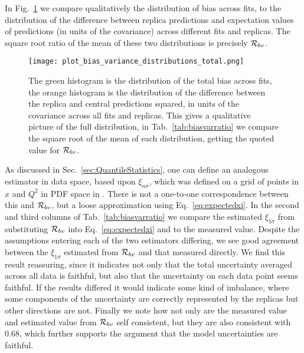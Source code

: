 In Fig.~\ref{eq:bias_varinace_distributions} we compare qualitatively the
distribution of bias across fits, to the distribution of the difference between
replica predictions and expectation values of predictions (in units of the
covariance) across different fits and replicas. The square root ratio of the
mean of these two distributions is precisely $\mathcal{R}_{bv}$.

\begin{figure}[h]
    \centering
    \texttt{[image: plot\_bias\_variance\_distributions\_total.png]}
    \caption{The green histogram is the distribution of the total bias across
    fits, the orange histogram is the distribution of the difference between the
    replica and central predictions squared, in units of the covariance across
    all fits and replicas. This gives a qualitative picture of the full
    distribution, in Tab.~\ref{tab:biasvarratio} we compare the square root of
    the mean of each distribution, getting the quoted value for
    $\mathcal{R}_{bv}$.}
    \label{eq:bias_varinace_distributions}
\end{figure}

As discussed in Sec.~\ref{sec:QuantileStatistics}, one can define an analogous
estimator in data space, based upon $\xi_{n\sigma}$, which was defined on a grid
of points in $x$ and $Q^2$ in PDF space in \cite{nnpdf30}. There is not a
one-to-one correspondence between this and $\mathcal{R}_{bv}$, but a loose
approximation using Eq.~\ref{eq:expectedxi}. In the second and third columns of
Tab.~\ref{tab:biasvarratio} we compare the estimated $\xi_{1\sigma}$ from
substituting $\mathcal{R}_{bv}$ into Eq.~\ref{eq:expectedxi} and to the measured
value. Despite the assumptions entering each of the two estimators differing, we
see good agreement between the $\xi_{1\sigma}$ estimated from $\mathcal{R}_{bv}$
and that measured directly. We find this result reassuring, since it indicates
not only that the total uncertainty averaged across all data is faithful, but
also that the uncertainty on each data point seems faithful. If the results
differed it would indicate some kind of imbalance, where some components of the
uncertainty are correctly represented by the replicas but other directions are
not. Finally we note how not only are the measured value and estimated value
from $\mathcal{R}_{bv}$ self consistent, but they are also consistent with $0.68$,
which further supports the argument that the model uncertainties are faithful.

